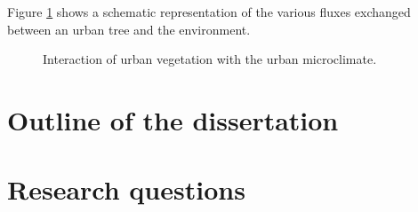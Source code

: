 Figure \ref{fig:vegetation_fluxes} shows a schematic representation of the various fluxes exchanged between an urban tree and the environment. 

\begin{figure}[h]
	\centering
	\caption{Interaction of urban vegetation with the urban microclimate.}
	\label{fig:vegetation_fluxes}
\end{figure}	




\section{Outline of the dissertation}



\section{Research questions}










